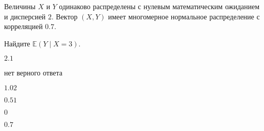 
\begin{question}
Величины \(X\) и \(Y\) одинаково распределены с нулевым математическим
ожиданием и дисперсией \(2\). Вектор \((X, Y)\) имеет многомерное
нормальное распределение с корреляцией \(0.7\).

Найдите \(\mathbb{E}(Y\mid X = 3)\).
\begin{answerlist}
  \item \(2.1\)
  \item нет верного ответа
  \item \(1.02\)
  \item \(0.51\)
  \item \(0\)
  \item \(0.7\)
\end{answerlist}
\end{question}


